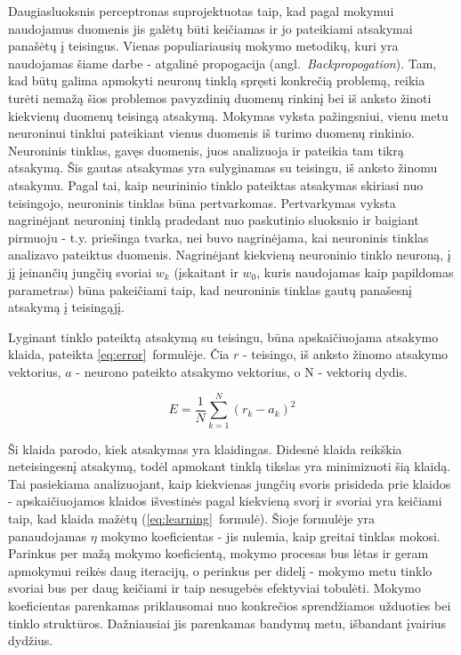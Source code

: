 \documentclass{VUMIFPSbakalaurinis}
\begin{document}
Daugiasluoksnis perceptronas suprojektuotas taip, kad pagal mokymui naudojamus duomenis jis galėtų būti keičiamas ir jo pateikiami atsakymai panašėtų į teisingus.
Vienas populiariausių mokymo metodikų, kuri yra naudojamas šiame darbe - atgalinė propogacija (angl.~\textit{Backpropogation}).
Tam, kad būtų galima apmokyti neuronų tinklą spręsti konkrečią problemą, reikia turėti nemažą šios problemos pavyzdinių duomenų rinkinį bei iš anksto žinoti kiekvienų duomenų teisingą atsakymą.
Mokymas vyksta pažingsniui, vienu metu neuroninui tinklui pateikiant vienus duomenis iš turimo duomenų rinkinio.
Neuroninis tinklas, gavęs duomenis, juos analizuoja ir pateikia tam tikrą atsakymą.
Šis gautas atsakymas yra sulyginamas su teisingu, iš anksto žinomu atsakymu.
Pagal tai, kaip neurininio tinklo pateiktas atsakymas skiriasi nuo teisingojo, neuroninis tinklas būna pertvarkomas.
Pertvarkymas vyksta nagrinėjant neuroninį tinklą pradedant nuo paskutinio sluoksnio ir baigiant pirmuoju - t.y. priešinga tvarka, nei buvo nagrinėjama, kai neuroninis tinklas analizavo pateiktus duomenis.
Nagrinėjant kiekvieną neuroninio tinklo neuroną, į jį įeinančių jungčių svoriai $w_k$ (įskaitant ir $w_0$, kuris naudojamas kaip papildomas parametras) būna pakeičiami taip, kad neuroninis tinklas gautų panašesnį atsakymą į teisingąjį.

Lyginant tinklo pateiktą atsakymą su teisingu, būna apskaičiuojama atsakymo klaida, pateikta \ref{eq:error}~formulėje.
Čia $r$ - teisingo, iš anksto žinomo atsakymo vektorius, $a$ - neurono pateikto atsakymo vektorius, o N - vektorių dydis.

\begin{equation} \label{eq:error}
E = \frac{1}{N} \sum_{k=1}^N (r_k - a_k)^2
\end{equation}

Ši klaida parodo, kiek atsakymas yra klaidingas.
Didesnė klaida reikškia neteisingesnį atsakymą, todėl apmokant tinklą tikslas yra minimizuoti šią klaidą.
Tai pasiekiama analizuojant, kaip kiekvienas jungčių svoris prisideda prie klaidos - apskaičiuojamos klaidos išvestinės pagal kiekvieną svorį ir svoriai yra keičiami taip, kad klaida mažėtų (\ref{eq:learning}~formulė).
Šioje formulėje yra panaudojamas $\eta$ mokymo koeficientas - jis nulemia, kaip greitai tinklas mokosi.
Parinkus per mažą mokymo koeficientą, mokymo procesas bus lėtas ir geram apmokymui reikės daug iteracijų, o perinkus per didelį - mokymo metu tinklo svoriai bus per daug keičiami ir taip nesugebės efektyviai tobulėti.
Mokymo koeficientas parenkamas priklausomai nuo konkrečios sprendžiamos užduoties bei tinklo struktūros.
Dažniausiai jis parenkamas bandymų metu, išbandant įvairius dydžius.
\end{document}

